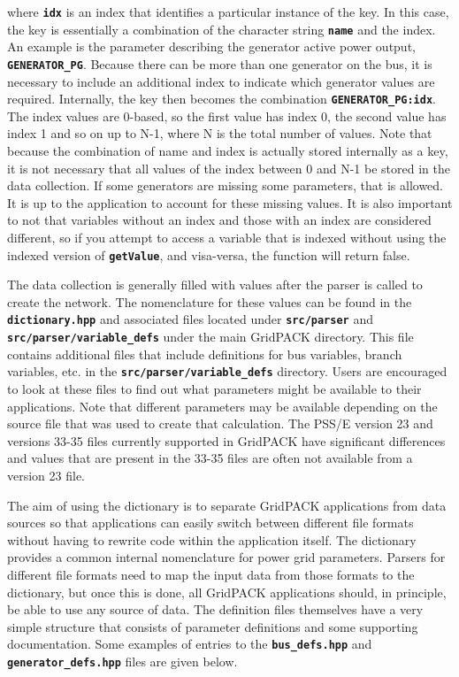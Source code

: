 where \texttt{\textbf{idx}} is an index that identifies a particular instance of
the key. In this case, the key is essentially a combination of the character
string \texttt{\textbf{name}} and the index. An example is the parameter
describing the generator active power output, \texttt{\textbf{GENERATOR\_PG}}.
Because there can be more than one generator on the bus, it is necessary to
include an additional index to indicate which generator values are required.
Internally, the key then becomes the combination
\texttt{\textbf{GENERATOR\_PG:idx}}. The index values are 0-based, so the first
value has index 0, the second value has index 1 and so on up to N-1, where N is
the total number of values. Note that because the combination of name and index
is actually stored internally as a key, it is not necessary that all values of
the index between 0 and N-1 be stored in the data collection. If some generators
are missing some parameters, that is allowed. It is up to the application to
account for these missing values. It is also important to not that variables
without an index and those with an index are considered different, so if you
attempt to access a variable that is indexed without using the indexed version
of \texttt{\textbf{getValue}}, and visa-versa, the function will return false.

The data collection is generally filled with values after the parser is called
to create the network. The nomenclature for these values can be found in the
\texttt{\textbf{dictionary.hpp}} and associated files located under
\texttt{\textbf{src/parser}} and \texttt{\textbf{src/parser/variable\_defs}}
under the main GridPACK directory. This file contains additional files that
include definitions for bus variables, branch variables, etc. in the
\texttt{\textbf{src/parser/variable\_defs}} directory. Users are encouraged to
look at these files to find out what parameters might be available to their
applications. Note that different parameters may be available depending on the
source file that was used to create that calculation. The PSS/E version 23 and
versions 33-35 files currently supported in GridPACK have significant
differences and values that are present in the 33-35 files are often not available from a version 23 file.

The aim of using the dictionary is to separate GridPACK applications from data sources so that applications can easily switch between different file formats without having to rewrite code within the application itself. The dictionary provides a common internal nomenclature for power grid parameters. Parsers for different file formats need to map the input data from those formats to the dictionary, but once this is done, all GridPACK applications should, in principle, be able to use any source of data.
The definition files themselves have a very simple structure that consists of
parameter definitions and some supporting documentation. Some examples of
entries to the \texttt{\textbf{bus\_defs.hpp}} and
\texttt{\textbf{generator\_defs.hpp}} files are given below.

